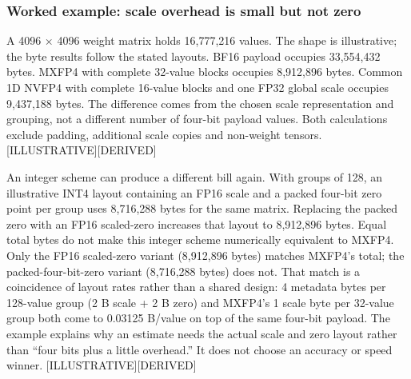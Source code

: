 \subsubsection{Worked example: scale overhead is small but not
zero}\label{worked-example-scale-overhead-is-small-but-not-zero}

A 4096 × 4096 weight matrix holds 16,777,216 values. The shape is
illustrative; the byte results follow the stated layouts. BF16 payload
occupies 33,554,432 bytes. MXFP4 with complete 32-value blocks occupies
8,912,896 bytes. Common 1D NVFP4 with complete 16-value blocks and one
FP32 global scale occupies 9,437,188 bytes. The difference comes from
the chosen scale representation and grouping, not a different number of
four-bit payload values. Both calculations exclude padding, additional
scale copies and non-weight tensors. \mbox{{[}ILLUSTRATIVE{]}}\hspace{0pt}\mbox{{[}DERIVED{]}}

An integer scheme can produce a different bill again. With groups of
128, an illustrative INT4 layout containing an FP16 scale and a packed
four-bit zero point per group uses 8,716,288 bytes for the same matrix.
Replacing the packed zero with an FP16 scaled-zero increases that layout
to 8,912,896 bytes. Equal total bytes do not make this integer scheme
numerically equivalent to MXFP4. Only the FP16 scaled-zero variant
(8,912,896 bytes) matches MXFP4's total; the packed-four-bit-zero
variant (8,716,288 bytes) does not. That match is a coincidence of
layout rates rather than a shared design: 4 metadata bytes per 128-value
group (2 B scale + 2 B zero) and MXFP4's 1 scale byte per 32-value group
both come to 0.03125 B/value on top of the same four-bit payload. The
example explains why an estimate needs the actual scale and zero layout
rather than ``four bits plus a little overhead.'' It does not choose an
accuracy or speed winner. \mbox{{[}ILLUSTRATIVE{]}}\hspace{0pt}\mbox{{[}DERIVED{]}}

